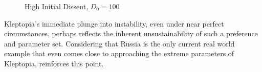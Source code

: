 \documentclass[12pt]{article}
\begin{document}
\begin{spacing}{1.5}
  
\begin{figure}[htb]
\centering 
{} 
\caption{High Initial Dissent, $D_0=100$}

\end{figure}

Kleptopia's immediate plunge into instability, even under near perfect circumstances, perhaps reflects the inherent unsustainability of such a preference and parameter set. Considering that Russia is the only current real world example that even comes close to approaching the extreme parameters of Kleptopia, reinforces this point. 



\end{spacing}
\end{document}
